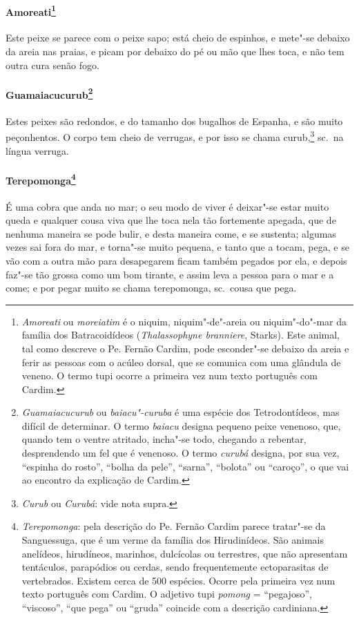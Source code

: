 \paragraph{Amoreati\footnote{ \textit{Amoreati} ou \textit{moreiatim} 
é o niquim, niquim"-de"-areia ou niquim"-do"-mar da família dos
Batracoidídeos (\textit{Thalassophyne branniere}, Starks). Este animal,
tal como descreve o Pe. Fernão Cardim, pode esconder"-se debaixo da
areia e ferir as pessoas com o acúleo dorsal, que se comunica com uma
glândula de veneno. O termo tupi ocorre a primeira vez num texto
português com Cardim.}} Este peixe se parece com o peixe
sapo; está cheio de espinhos, e mete"-se debaixo da areia nas praias, e
picam por debaixo do pé ou mão que lhes toca, e não tem outra cura
senão fogo.

\paragraph{Guamaiacucurub\footnote{ \textit{Guamaiacucurub} ou
\textit{baiacu"-curuba} é uma espécie dos Tetrodontídeos, mas difícil
de determinar. O termo \textit{baiacu} designa pequeno peixe venenoso,
que, quando tem o ventre atritado, incha"-se todo, chegando a rebentar,
desprendendo um fel que é venenoso. O termo \textit{curubá} designa,
por sua vez, ``espinha do rosto'', ``bolha da pele'', ``sarna'', ``bolota'' ou
``caroço'', o que vai ao encontro da explicação de Cardim.}} 
Estes peixes são redondos, e do tamanho dos bugalhos de Espanha, e são
muito peçonhentos. O corpo tem cheio de verrugas, e por isso se chama
curub,\footnote{ \textit{Curub} ou \textit{Curubá}: vide nota supra.} 
sc.~na língua verruga.

\paragraph{Terepomonga\footnote{ \textit{Terepomonga}: pela descrição
do Pe. Fernão Cardim parece tratar"-se da Sanguessuga, que é um verme da
família dos Hirudinídeos. São animais anelídeos, hirudíneos, marinhos,
dulcícolas ou terrestres, que não apresentam tentáculos, parapódios ou
cerdas, sendo frequentemente ectoparasitas de vertebrados. Existem
cerca de 500 espécies. Ocorre pela primeira vez num texto português com
Cardim. O adjetivo tupi \textit{pomong} = ``pegajoso'', ``viscoso'', ``que
pega'' ou ``gruda'' coincide com a descrição cardiniana.}} É uma
cobra que anda no mar; o seu modo de viver é deixar"-se estar muito
queda e qualquer cousa viva que lhe toca nela tão fortemente apegada,
que de nenhuma maneira se pode bulir, e desta maneira come, e se
sustenta; algumas vezes sai fora do mar, e torna"-se muito pequena, e
tanto que a tocam, pega, e se vão com a outra mão para desapegarem
ficam também pegados por ela, e depois faz"-se tão grossa como um bom
tirante, e assim leva a pessoa para o mar e a come; e por pegar muito
se chama terepomonga, sc.~cousa que pega. 

